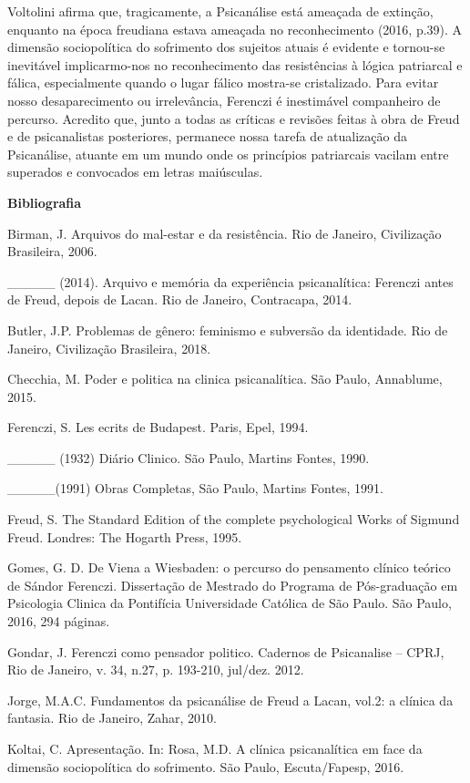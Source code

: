 Voltolini afirma que, tragicamente, a Psicanálise está ameaçada de
extinção, enquanto na época freudiana estava ameaçada no reconhecimento
(2016, p.39). A dimensão sociopolítica do sofrimento dos sujeitos atuais
é evidente e tornou-se inevitável implicarmo-nos no reconhecimento das
resistências à lógica patriarcal e fálica, especialmente quando o lugar
fálico mostra-se cristalizado. Para evitar nosso desaparecimento ou
irrelevância, Ferenczi é inestimável companheiro de percurso. Acredito
que, junto a todas as críticas e revisões feitas à obra de Freud e de
psicanalistas posteriores, permanece nossa tarefa de atualização da
Psicanálise, atuante em um mundo onde os princípios patriarcais vacilam
entre superados e convocados em letras maiúsculas.

\textbf{Bibliografia}

Birman, J. Arquivos do mal-estar e da resistência. Rio de Janeiro,
Civilização Brasileira, 2006.

\_\_\_\_\_ (2014). Arquivo e memória da experiência psicanalítica:
Ferenczi antes de Freud, depois de Lacan. Rio de Janeiro, Contracapa,
2014.

Butler, J.P. Problemas de gênero: feminismo e subversão da identidade.
Rio de Janeiro, Civilização Brasileira, 2018.

Checchia, M. Poder e politica na clinica psicanalítica. São Paulo,
Annablume, 2015.

Ferenczi, S. Les ecrits de Budapest. Paris, Epel, 1994.

\_\_\_\_\_ (1932) Diário Clinico. São Paulo, Martins Fontes, 1990.

\_\_\_\_\_(1991) Obras Completas, São Paulo, Martins Fontes, 1991.

Freud, S. The Standard Edition of the complete psychological Works of
Sigmund Freud. Londres: The Hogarth Press, 1995.

Gomes, G. D. De Viena a Wiesbaden: o percurso do pensamento clínico
teórico de Sándor Ferenczi. Dissertação de Mestrado do Programa de
Pós-graduação em Psicologia Clinica da Pontifícia Universidade Católica
de São Paulo. São Paulo, 2016, 294 páginas.

Gondar, J. Ferenczi como pensador politico. Cadernos de Psicanalise --
CPRJ, Rio de Janeiro, v. 34, n.27, p. 193-210, jul/dez. 2012.

Jorge, M.A.C. Fundamentos da psicanálise de Freud a Lacan, vol.2: a
clínica da fantasia. Rio de Janeiro, Zahar, 2010.

Koltai, C. Apresentação. In: Rosa, M.D. A clínica psicanalítica em face
da dimensão sociopolítica do sofrimento. São Paulo, Escuta/Fapesp, 2016.

